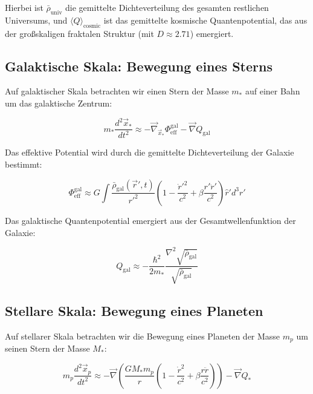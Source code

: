Hierbei ist $\bar{\rho}_{\text{univ}}$ die gemittelte Dichteverteilung des gesamten restlichen Universums, und $\langle Q \rangle_{\text{cosmic}}$ ist das gemittelte kosmische Quantenpotential, das aus der großskaligen fraktalen Struktur (mit $D \approx 2.71$) emergiert.

\subsection{Galaktische Skala: Bewegung eines Sterns}

Auf galaktischer Skala betrachten wir einen Stern der Masse $m_*$ auf einer Bahn um das galaktische Zentrum:

\begin{equation}
m_* \frac{d^2 \vec{x}_*}{dt^2} \approx -\vec{\nabla}_{\vec{x}_*} \Phi_{\text{eff}}^{\text{gal}} - \vec{\nabla} Q_{\text{gal}}
\end{equation}

Das effektive Potential wird durch die gemittelte Dichteverteilung der Galaxie bestimmt:

\begin{equation}
\Phi_{\text{eff}}^{\text{gal}} \approx G \int \frac{\bar{\rho}_{\text{gal}}(\vec{r}', t)}{r'^2} \left(1 - \frac{\dot{r}'^2}{c^2} + \beta \frac{r' \ddot{r}'}{c^2}\right) \hat{r}'  d^3r'
\end{equation}

Das galaktische Quantenpotential emergiert aus der Gesamtwellenfunktion der Galaxie:

\begin{equation}
Q_{\text{gal}} \approx -\frac{\hbar^2}{2 m_*} \frac{\nabla^2 \sqrt{\bar{\rho}_{\text{gal}}}}{\sqrt{\bar{\rho}_{\text{gal}}}} 
\end{equation}

\subsection{Stellare Skala: Bewegung eines Planeten}

Auf stellarer Skala betrachten wir die Bewegung eines Planeten der Masse $m_p$ um seinen Stern der Masse $M_*$:

\begin{equation}
m_p \frac{d^2 \vec{x}_p}{dt^2} \approx -\vec{\nabla} \left( \frac{G M_* m_p}{r} \left(1 - \frac{\dot{r}^2}{c^2} + \beta \frac{r \ddot{r}}{c^2}\right) \right) - \vec{\nabla} Q_{*}
\end{equation}

